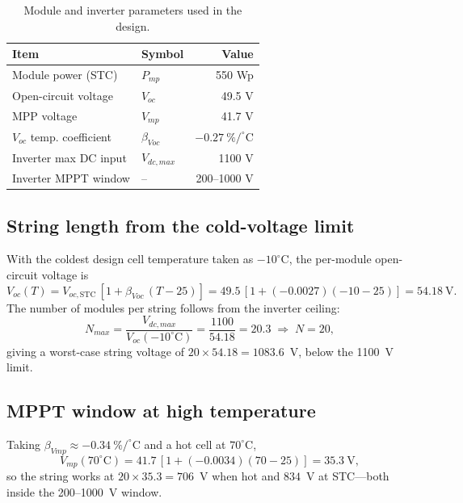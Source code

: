 \documentclass[11pt,a4paper]{article}
\begin{document}
\begin{table}[h]
\centering
\caption{Module and inverter parameters used in the design.}
\label{tab:params}
\begin{tabular}{llr}
\toprule
Item & Symbol & Value \\
\midrule
Module power (STC)        & $P_{mp}$        & 550 Wp \\
Open-circuit voltage       & $V_{oc}$        & 49.5 V \\
MPP voltage                & $V_{mp}$        & 41.7 V \\
$V_{oc}$ temp. coefficient & $\beta_{Voc}$   & $-0.27~\%/^\circ$C \\
Inverter max DC input      & $V_{dc,max}$    & 1100 V \\
Inverter MPPT window       & --              & 200--1000 V \\
\bottomrule
\end{tabular}
\end{table}

\subsection{String length from the cold-voltage limit}
With the coldest design cell temperature taken as $-10^\circ$C, the per-module open-circuit
voltage is
\begin{equation}
V_{oc}(T) = V_{oc,\mathrm{STC}}\,[1+\beta_{Voc}\,(T-25)]
          = 49.5\,[1+(-0.0027)(-10-25)] = 54.18~\text{V}.
\end{equation}
The number of modules per string follows from the inverter ceiling:
\begin{equation}
N_{max} = \frac{V_{dc,max}}{V_{oc}(-10^\circ\mathrm{C})} = \frac{1100}{54.18} = 20.3
\;\Rightarrow\; N = 20,
\end{equation}
giving a worst-case string voltage of $20\times54.18 = 1083.6$~V, below the 1100~V limit.

\subsection{MPPT window at high temperature}
Taking $\beta_{Vmp}\approx-0.34~\%/^\circ$C and a hot cell at $70^\circ$C,
\begin{equation}
V_{mp}(70^\circ\mathrm{C}) = 41.7\,[1+(-0.0034)(70-25)] = 35.3~\text{V},
\end{equation}
so the string works at $20\times35.3 = 706$~V when hot and $834$~V at STC---both inside the
200--1000~V window.
\end{document}
